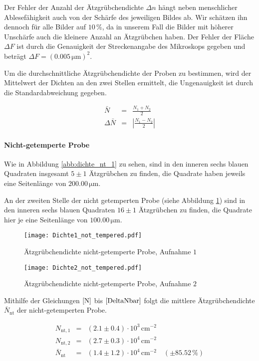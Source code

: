 \documentclass[12pt,a4paper]{scrartcl}
\numberwithin{equation}{section} %
\renewcommand{\[}{} %
\renewcommand{\]}{\noindent} %
\begin{document}
Der Fehler der Anzahl der Ätzgrübchendichte \(\Delta n\) hängt neben
menschlicher Ablesefähigkeit auch von der Schärfe des jeweiligen Bildes
ab. Wir schätzen ihn dennoch für alle Bilder auf \(10\,\%\), da in
unserem Fall die Bilder mit höherer Unschärfe auch die kleinere Anzahl
an Ätzgrübchen haben. Der Fehler der Fläche \(\Delta F\) ist durch die
Genauigkeit der Streckenangabe des Mikroskops gegeben und beträgt
\(\Delta F=(0.005 \mathrm{\, \mu m})^2\).

Um die durchschnittliche Ätzgrübchendichte der Proben zu bestimmen,
wird der Mittelwert der Dichten an den zwei Stellen ermittelt, die
Ungenauigkeit ist durch die Standardabweichung gegeben.
\[
\begin{eqnarray}
    \bar{N} &=& \frac{N_1 + N_2}{2} \label{Nbar}\\
    \Delta \bar N &=& \left| \frac{N_1 - N_2}{2} \right| \label{DeltaNbar}
\end{eqnarray}
\]

\hypertarget{nicht-getemperte-probe}{%
\paragraph*{Nicht-getemperte Probe}\label{nicht-getemperte-probe}}

Wie in Abbildung \ref{abb:dichte_nt_1} zu sehen, sind in den inneren sechs blauen Quadraten insgesamt \(5\pm1\) Ätzgrübchen zu finden, die Quadrate haben
jeweils eine Seitenlänge von \(200.00 \mathrm{\,\mu m}\).

An der zweiten Stelle der nicht getemperten Probe (siehe Abbildung
\ref{abb:dichte_nt_2}) sind in den inneren sechs blauen Quadraten \(16\pm1\)
Ätzgrübchen zu finden, die Quadrate hier je eine Seitenlänge von
\(100.00 \mathrm{\, \mu m}\).

\begin{figure}[ht]
	\begin{minipage}[t]{.5\linewidth}
		\texttt{[image: Dichte1\_not\_tempered.pdf]}
		\caption{Ätzgrübchendichte nicht-getemperte Probe, Aufnahme $1$}
		\label{abb:dichte_nt_1}
	\end{minipage}
	\begin{minipage}[t]{.5\linewidth}
		\texttt{[image: Dichte2\_not\_tempered.pdf]}
		\caption{Ätzgrübchendichte nicht-getemperte Probe, Aufnahme $2$}
		\label{abb:dichte_nt_2}
	\end{minipage}
\end{figure}

Mithilfe der Gleichungen \(\eqref{N}\) bis \(\eqref{DeltaNbar}\) folgt
die mittlere Ätzgrübchendichte \(\bar N_\mathrm{nt}\) der
nicht-getemperten Probe.
\[
\begin{eqnarray}
    N_\mathrm{nt,1} &=& (2.1 \pm 0.4) \cdot 10^3 \mathrm{\, cm^{-2}} \\
    N_\mathrm{nt,2} &=& (2.7 \pm 0.3) \cdot 10^{4} \mathrm{\, cm^{-2}} \\
    \bar N_\mathrm{nt}
        &=& (1.4 \pm 1.2) \cdot 10^4 \mathrm{\, cm^{-2}}
        \quad(\pm 85.52\,\%)
\end{eqnarray}
\]
\end{document}
